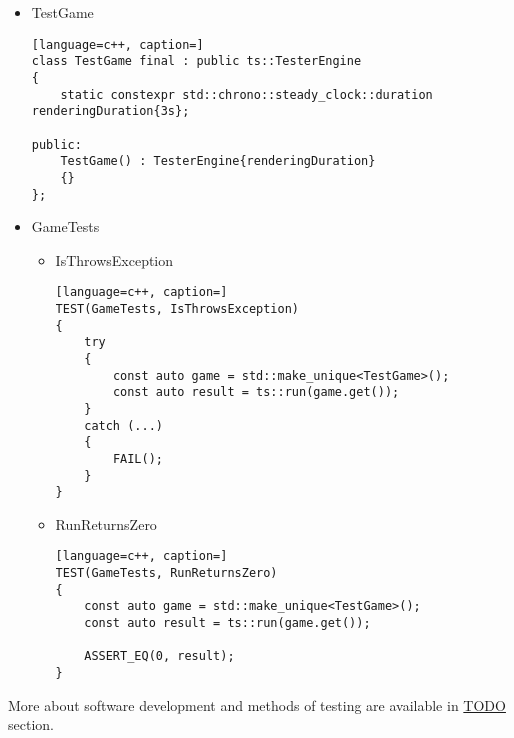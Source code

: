 \begin{itemize}
\begin{itemize}
\begin{lstlisting}[language=c++, caption=]
    const auto invertedMatrix = ts::math::inverse(matrix);
    ASSERT_EQ(ts::math::to_string(invertedMatrix), ts::math::to_string(expected));
}
            \end{lstlisting}
            \item mat4rotationTest  Verifies if rotation functionality works correctly.
            \begin{lstlisting}[language=c++, caption=]
TEST(MathTests, mat4rotationTest)
{
    const auto matrix = ts::math::Mat4(1.f);

    const ts::math::Vec3 axis{0.f, 1.f, 0.f};
    const auto result = ts::math::rotate(matrix, axis, ts::math::radians(180.f));

    const ts::math::Mat4 expected
    {
        -1.f, +0.f, +0.f, +0.f,
        +0.f, +1.f, +0.f, +0.f,
        +0.f, +0.f, -1.f, +0.f,
        +0.f, +0.f, +0.f, +1.f,
    };
    ASSERT_TRUE(expected[0].x == result[0].x and expected[1].y == result[1].y and expected[2].z == result[2].z);
}
            \end{lstlisting}
        \end{itemize}
    \item TestGame
        \begin{lstlisting}[language=c++, caption=]
class TestGame final : public ts::TesterEngine
{
    static constexpr std::chrono::steady_clock::duration renderingDuration{3s};

public:
    TestGame() : TesterEngine{renderingDuration}
    {}
};
        \end{lstlisting}
    \item GameTests
        \begin{itemize}
            \item IsThrowsException
            \begin{lstlisting}[language=c++, caption=]
TEST(GameTests, IsThrowsException)
{
    try
    {
        const auto game = std::make_unique<TestGame>();
        const auto result = ts::run(game.get());
    }
    catch (...)
    {
        FAIL();
    }
}
            \end{lstlisting}
            \item RunReturnsZero
            \begin{lstlisting}[language=c++, caption=]
TEST(GameTests, RunReturnsZero)
{
    const auto game = std::make_unique<TestGame>();
    const auto result = ts::run(game.get());

    ASSERT_EQ(0, result);
}
            \end{lstlisting}
        \end{itemize}
\end{itemize}

More about software development and methods of testing are available in \hyperref[sec:testing]{TODO} section.